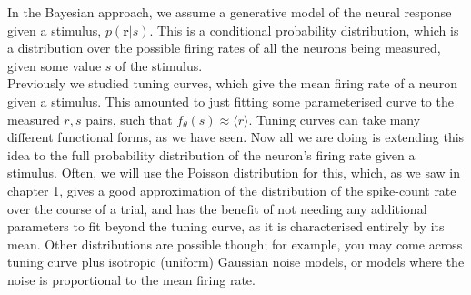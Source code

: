 \documentclass{article}
\begin{document}
In the Bayesian approach, we assume a generative model of the neural response given a stimulus, $p(\bm{r}|s)$. This is a conditional probability distribution, which is a distribution over the possible firing rates of all the neurons being measured, given some value $s$ of the stimulus.\\

Previously we studied tuning curves, which give the mean firing rate of a neuron given a stimulus. This amounted to just fitting some parameterised curve to the measured $r, s$ pairs, such that $f_\theta(s) \approx \langle r \rangle$. Tuning curves can take many different functional forms, as we have seen. Now all we are doing is extending this idea to the full probability distribution of the neuron's firing rate given a stimulus. Often, we will use the Poisson distribution for this, which, as we saw in chapter 1, gives a good approximation of the distribution of the spike-count rate over the course of a trial, and has the benefit of not needing any additional parameters to fit beyond the tuning curve, as it is characterised entirely by its mean. Other distributions are possible though; for example, you may come across tuning curve plus isotropic (uniform) Gaussian noise models, or models where the noise is proportional to the mean firing rate.
\end{document}
